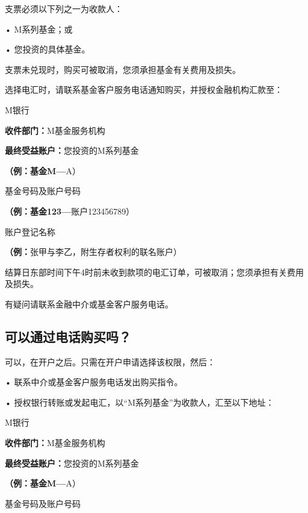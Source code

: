 \documentclass[UTF8,fontset=none,11pt,a4paper]{ctexart}
\begin{document}
\noindent 支票必须以下列之一\allowbreak\mbox{为收款人：}\par\smallskip
\noindent • M系列基金；或\par\smallskip
\noindent • 您投资的\allowbreak\mbox{具体基金。}\par\smallskip
支票未兑现时，购买可被取消，您须承担基金有关费\allowbreak\mbox{用及损失。}


\par{}\label{originalpage12}

选择电汇时，请联系基金客户服务电话通知购买，并授权金融机构\allowbreak\mbox{汇款至：}

M银行



\textbf{收件部门：}M基金\allowbreak\mbox{服务机构}



\textbf{最终受益账户：}您投资的M\allowbreak\mbox{系列基金}

\textbf{（例：基金M—}A）

基金号码及\allowbreak\mbox{账户号码}

\textbf{（例：基金123—}账户123456789）

账户\allowbreak\mbox{登记名称}

\textbf{（例：}张甲与李乙，附生存者权利的\allowbreak\mbox{联名账户）}

结算日东部时间下午4时前未收到款项的电汇订单，可被取消；您须承担有关费\allowbreak\mbox{用及损失。}

有疑问请联系金融中介或基金客户服\allowbreak\mbox{务电话。}

\subsection*{可以通过电话购买吗？}
可以，在开户之后。只需在开户申请选择该权限，然后：

\noindent • 联系中介或基金客户服务电话发出购买指令。\par\smallskip
\noindent • 授权银行转账或发起电汇，以“M系列基金”为收款人，汇至\allowbreak\mbox{以下地址：}\par\smallskip
M银行



\textbf{收件部门：}M基金\allowbreak\mbox{服务机构}



\textbf{最终受益账户：}您投资的M\allowbreak\mbox{系列基金}

\textbf{（例：基金M—}A）

基金号码及\allowbreak\mbox{账户号码}
\end{document}
